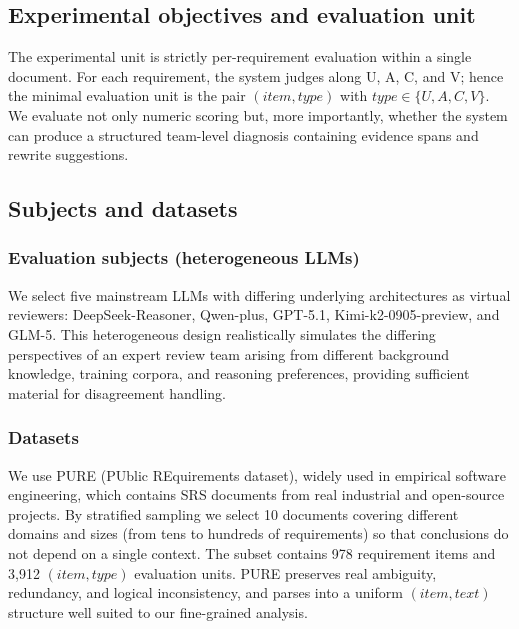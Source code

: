 \documentclass[sn-mathphys-num]{sn-jnl}
\begin{document}
\subsection{Experimental objectives and evaluation unit}
The experimental unit is strictly per-requirement evaluation within a single document. For each requirement, the system judges along U, A, C, and V; hence the minimal evaluation unit is the pair $(item,type)$ with $type\in\{U,A,C,V\}$. We evaluate not only numeric scoring but, more importantly, whether the system can produce a structured team-level diagnosis containing evidence spans and rewrite suggestions.

\subsection{Subjects and datasets}
\subsubsection{Evaluation subjects (heterogeneous LLMs)}
We select five mainstream LLMs with differing underlying architectures as virtual reviewers: DeepSeek-Reasoner, Qwen-plus, GPT-5.1, Kimi-k2-0905-preview, and GLM-5. This heterogeneous design realistically simulates the differing perspectives of an expert review team arising from different background knowledge, training corpora, and reasoning preferences, providing sufficient material for disagreement handling.

\subsubsection{Datasets}\label{sec:datasets}
We use PURE (PUblic REquirements dataset), widely used in empirical software engineering, which contains SRS documents from real industrial and open-source projects. By stratified sampling we select 10 documents covering different domains and sizes (from tens to hundreds of requirements) so that conclusions do not depend on a single context. The subset contains 978 requirement items and 3{,}912 $(item,type)$ evaluation units. PURE preserves real ambiguity, redundancy, and logical inconsistency, and parses into a uniform $(item, text)$ structure well suited to our fine-grained analysis.


\end{document}
